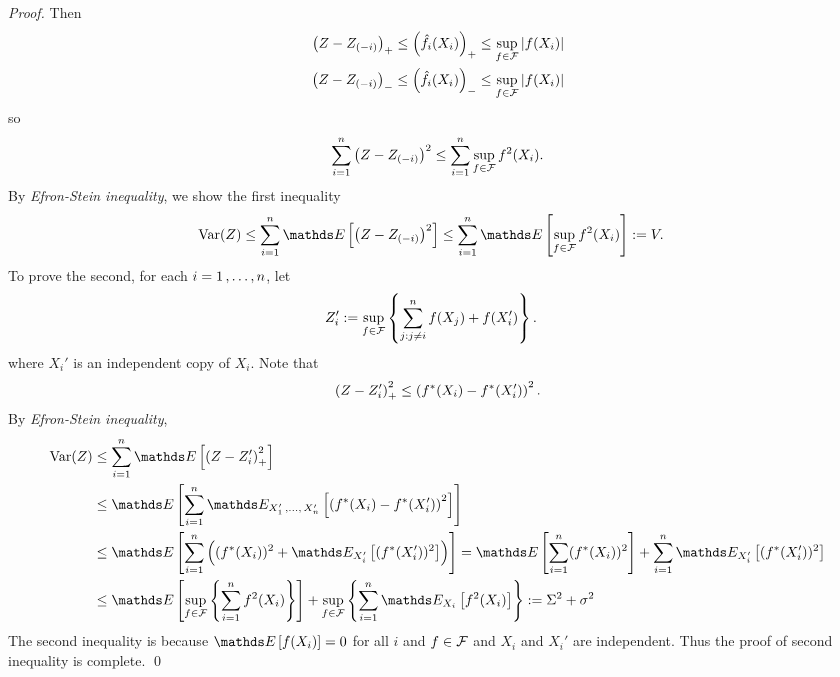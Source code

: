 \documentclass[11pt]{article}
\begin{document}
\begin{itemize}
\begin{proof}
Then
\begin{align*}
\left(Z - Z_{(-i)}\right)_{+} \le  \left(\hat{f}_i(X_i)\right)_{+} \le \sup_{f \in {\mathcal F}}\left\lvert f(X_i) \right\rvert\\
\left(Z - Z_{(-i)}\right)_{-} \le  \left(\hat{f}_i(X_i)\right)_{-} \le \sup_{f \in {\mathcal F}}\left\lvert f(X_i) \right\rvert
\end{align*} so
\begin{align*}
\sum_{i=1}^{n}\left(Z - Z_{(-i)}\right)^2 \le \sum_{i=1}^{n}\sup_{f \in {\mathcal F}}f^2(X_i). 
\end{align*} By \emph{Efron-Stein inequality}, we show the first inequality
\begin{align*}
\text{Var}(Z) &\le \sum_{i=1}^{n}\E{}{\paren{Z - Z_{(-i)}}^2} \le \sum_{i=1}^{n}\E{}{\sup_{f \in \cF}f^2(X_i)} := V.
\end{align*}
To prove the second, for each  $i = 1 \,{,}\ldots{,}\, n$, let
\begin{align*}
Z_{i}' &:= \sup_{f \in {\mathcal F}}\left\{\sum_{j: j\neq i}^n f(X_j) + f(X_i')\right\}.
\end{align*} where $X_i'$ is an independent copy of $X_i$. Note that
\begin{align*}
\left(Z - Z_{i}'\right)_{+}^2 \le \left(f^{*}(X_i) - f^{*} (X_i')\right)^2.
\end{align*} By \emph{Efron-Stein inequality}, 
\begin{align*}
\text{Var}(Z) &\le \sum_{i=1}^n\E{}{\paren{Z - Z_{i}'}_{+}^2}\\
&\le   \E{}{\sum_{i=1}^n\E{X_1' \xdotx{,} X_n'}{\paren{f^{*}(X_i) - f^{*} (X_i')}^2}}\\
&\le  \E{}{\sum_{i=1}^n\paren{ (f^{*}(X_i))^2 + \E{X_i'}{(f^{*} (X_i'))^2}}} = \E{}{\sum_{i=1}^n(f^{*}(X_i))^2} +  \sum_{i=1}^n\E{X_i'}{(f^{*} (X_i'))^2} \\
&\le  \E{}{\sup_{f \in \cF}\set{\sum_{i=1}^n f^2(X_i)}} + \sup_{f \in \cF}\set{ \sum_{i=1}^n\E{X_i}{f^{2} (X_i)}} := \Sigma^2 + \sigma^2
\end{align*} The second inequality is because $\E{}{f(X_i)} =0$ for all $i$ and $f \in {\mathcal F}$ and $X_i$ and $X_i'$ are independent. Thus the proof of second inequality is complete. \qed 
\end{proof}
\end{itemize}
\end{document}
